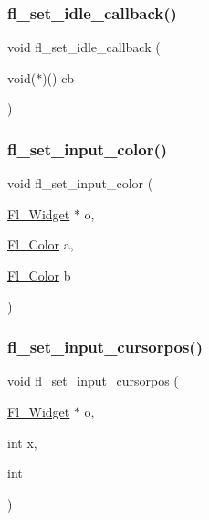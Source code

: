 \mbox{\label{forms_8_h_a1d94c68c3e210b585d117321e9be8cc1}} 
\subsubsection{\texorpdfstring{fl\+\_\+set\+\_\+idle\+\_\+callback()}{fl\_set\_idle\_callback()}}
{\footnotesize\ttfamily void fl\+\_\+set\+\_\+idle\+\_\+callback (\begin{DoxyParamCaption}\item[{void($\ast$)()}]{cb }\end{DoxyParamCaption})\hspace{0.3cm}{\ttfamily [inline]}}

\mbox{\label{forms_8_h_acc2e01462754ddf24bde1fc9a7018eca}} 
\subsubsection{\texorpdfstring{fl\+\_\+set\+\_\+input\+\_\+color()}{fl\_set\_input\_color()}}
{\footnotesize\ttfamily void fl\+\_\+set\+\_\+input\+\_\+color (\begin{DoxyParamCaption}\item[{\hyperlink{class_fl___widget}{Fl\+\_\+\+Widget} $\ast$}]{o,  }\item[{\hyperlink{_enumerations_8_h_a8b762953646f8abee866061f1af78a6a}{Fl\+\_\+\+Color}}]{a,  }\item[{\hyperlink{_enumerations_8_h_a8b762953646f8abee866061f1af78a6a}{Fl\+\_\+\+Color}}]{b }\end{DoxyParamCaption})\hspace{0.3cm}{\ttfamily [inline]}}

\mbox{\label{forms_8_h_a1eec22c1bb01b4b7db52d34e5a1b638f}} 
\subsubsection{\texorpdfstring{fl\+\_\+set\+\_\+input\+\_\+cursorpos()}{fl\_set\_input\_cursorpos()}}
{\footnotesize\ttfamily void fl\+\_\+set\+\_\+input\+\_\+cursorpos (\begin{DoxyParamCaption}\item[{\hyperlink{class_fl___widget}{Fl\+\_\+\+Widget} $\ast$}]{o,  }\item[{int}]{x,  }\item[{int}]{ }\end{DoxyParamCaption})\hspace{0.3cm}{\ttfamily [inline]}}

